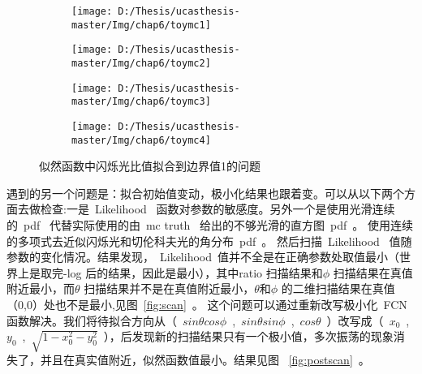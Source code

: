 \begin{figure}[!htbp]
  \centering
  \begin{subfigure}[b]{\MySubFactor\textwidth}
    \texttt{[image: D:/Thesis/ucasthesis-master/Img/chap6/toymc1]}
    \caption{ }
    \label{fig:pratiop_1}
  \end{subfigure}%
  \quad\quad\quad\quad\quad\quad%
  \begin{subfigure}[b]{\MySubFactor\textwidth}
    \texttt{[image: D:/Thesis/ucasthesis-master/Img/chap6/toymc2]}
    \caption{ }
    \label{fig:pratiop_2}
  \end{subfigure}
  \begin{subfigure}[b]{\MySubFactor\textwidth}
    \texttt{[image: D:/Thesis/ucasthesis-master/Img/chap6/toymc3]}
    \caption{ }
    \label{fig:pratiop_3}
  \end{subfigure}%
  \quad\quad\quad\quad\quad\quad%
  \begin{subfigure}[b]{\MySubFactor\textwidth}
    \texttt{[image: D:/Thesis/ucasthesis-master/Img/chap6/toymc4]}
    \caption{ }
    \label{fig:pratiop_4}
  \end{subfigure}
  \caption{似然函数中闪烁光比值拟合到边界值1的问题}
  \label{fig:pratiop}
\end{figure}
遇到的另一个问题是：拟合初始值变动，极小化结果也跟着变。可以从以下两个方面去做检查:一是~Likelihood~ 函数对参数的敏感度。另外一个是使用光滑连续的~pdf~ 代替实际使用的由~mc truth~ 给出的不够光滑的直方图~pdf~。 使用连续的多项式去近似闪烁光和切伦科夫光的角分布~pdf~。 然后扫描~Likelihood~ 值随参数的变化情况。结果发现，~Likelihood~值并不全是在正确参数处取值最小（世界上是取完-log 后的结果，因此是最小），其中ratio 扫描结果和$\phi$ 扫描结果在真值附近最小，而$\theta$ 扫描结果并不是在真值附近最小，$\theta$和$\phi$ 的二维扫描结果在真值（0,0）处也不是最小,见图~\ref{fig:scan}~。 这个问题可以通过重新改写极小化~FCN~ 函数解决。我们将待拟合方向从（~$sin\theta cos\phi$~,~$sin\theta sin\phi$~,~$cos\theta$~）改写成（~$ x_0$~,~$y_0$~,~$\sqrt{1-x^2_0-y^2_0}$~），后发现新的扫描结果只有一个极小值，多次振荡的现象消失了，并且在真实值附近，似然函数值最小。结果见图
~\ref{fig:postscan}~。
